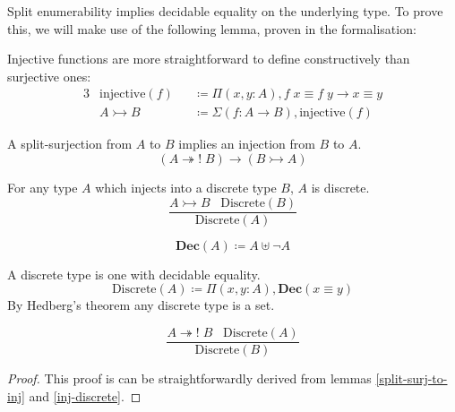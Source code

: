 Split enumerability implies decidable equality on the underlying type.
To prove this, we will make use of the following lemma, proven in the
formalisation:
\begin{definition}[Injections]
  Injective functions are more straightforward to define constructively than
  surjective ones:
  \begin{alignat}{3}
    & \text{injective}(f) &&\coloneqq \Pi (x, y : A) , f \; x \equiv f \; y \rightarrow x \equiv y \\
    & A \rightarrowtail B &&\coloneqq \Sigma(f : A \rightarrow B) , \text{injective}(f)
  \end{alignat}
\end{definition}
\begin{lemma} \label{split-surj-to-inj}
  A split-surjection from \(A\) to \(B\) implies an injection from \(B\) to
  \(A\).
  \begin{equation}
    (A \twoheadrightarrow! \; B) \rightarrow (B \rightarrowtail A)
  \end{equation}
\end{lemma}
\begin{lemma} \label{inj-discrete}
  For any type \(A\) which injects into a discrete type \(B\), \(A\) is
  discrete.
  \begin{equation}
    \frac{
      A \rightarrowtail B \; \; \; \text{Discrete}(B)
    }{
      \text{Discrete}(A)
    }
  \end{equation}
\end{lemma}

\begin{definition}
  \begin{equation}
    \mathbf{Dec}(A) \coloneqq A \uplus \neg A
  \end{equation}
\end{definition}
\begin{definition}
  A discrete type is one with decidable equality.
  \begin{equation}
    \text{Discrete}(A) \coloneqq \Pi(x, y : A) , \mathbf{Dec}(x \equiv y)
  \end{equation}
  By Hedberg's theorem \cite{hedbergCoherenceTheoremMartinLof1998} any discrete
  type is a set.
\end{definition}

\begin{lemma} \label{discrete-surj}
  \begin{equation}
    \frac{
      A \twoheadrightarrow! \; B \; \; \; \text{Discrete}(A)
    }{
      \text{Discrete}(B) 
    }
  \end{equation}
\end{lemma}
\begin{proof}
  This proof is can be straightforwardly derived from lemmas
  \ref{split-surj-to-inj} and \ref{inj-discrete}.
\end{proof}

